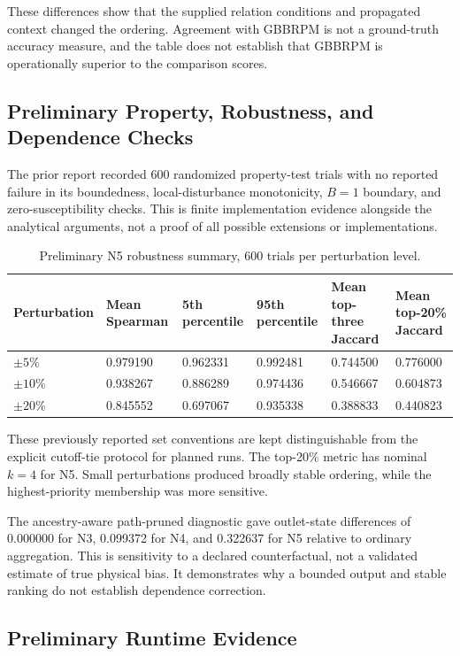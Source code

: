 These differences show that the supplied relation conditions and
propagated context changed the ordering. Agreement with GBBRPM is not
a ground-truth accuracy measure, and the table does not establish that
GBBRPM is operationally superior to the comparison scores.

\subsection{Preliminary Property, Robustness, and Dependence Checks}

The prior report recorded 600 randomized property-test trials with no
reported failure in its boundedness, local-disturbance monotonicity,
$B=1$ boundary, and zero-susceptibility checks. This is finite
implementation evidence alongside the analytical arguments, not a proof
of all possible extensions or implementations.

\begin{table}[H]
\centering
\caption{Preliminary N5 robustness summary, 600 trials per perturbation level.}
\label{tab:prelim-robustness}
\small
\begin{tabularx}{\textwidth}{@{}l*{5}{Y}@{}}
\toprule
Perturbation & Mean Spearman & 5th percentile & 95th percentile & Mean top-three Jaccard & Mean top-20\% Jaccard\\
\midrule
$\pm5\%$ & 0.979190 & 0.962331 & 0.992481 & 0.744500 & 0.776000\\
$\pm10\%$ & 0.938267 & 0.886289 & 0.974436 & 0.546667 & 0.604873\\
$\pm20\%$ & 0.845552 & 0.697067 & 0.935338 & 0.388833 & 0.440823\\
\bottomrule
\end{tabularx}
\end{table}

These previously reported set conventions are kept distinguishable from
the explicit cutoff-tie protocol for planned runs. The top-20\% metric has
nominal $k=4$ for N5. Small perturbations produced broadly stable
ordering, while the highest-priority membership was more sensitive.

The ancestry-aware path-pruned diagnostic gave outlet-state differences
of 0.000000 for N3, 0.099372 for N4, and 0.322637 for N5 relative to
ordinary aggregation. This is sensitivity to a declared counterfactual,
not a validated estimate of true physical bias. It demonstrates why a
bounded output and stable ranking do not establish dependence correction.

\subsection{Preliminary Runtime Evidence}


